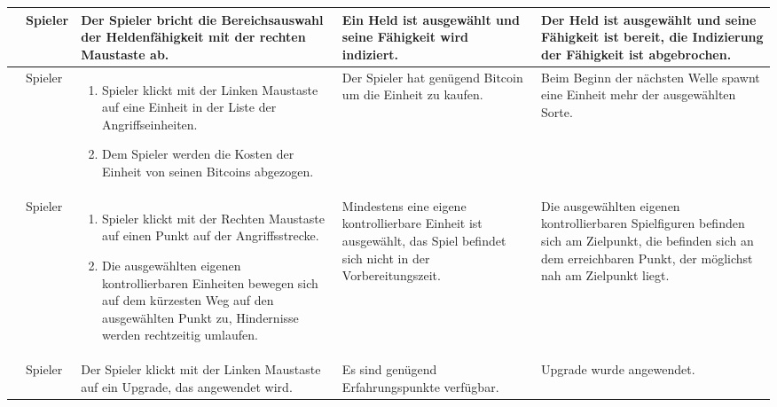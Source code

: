 \begin{longtabu}{X[0.6L]X[0.4L]X[L]X[L]X[L]}
	& Spieler
	& Der Spieler bricht die Bereichsauswahl der Heldenfähigkeit mit der rechten Maustaste ab.
	& Ein Held ist ausgewählt und seine Fähigkeit wird indiziert.
	& Der Held ist ausgewählt und seine Fähigkeit ist bereit, die Indizierung der Fähigkeit ist abgebrochen.
	\\\midrule

    & Spieler
    & \vspace*{-0.2cm}\begin{enumerate}[nosep,leftmargin=*]
        \item Spieler klickt mit der Linken Maustaste auf eine Einheit in der
          Liste der Angriffseinheiten.
        \item Dem Spieler werden die Kosten der Einheit von seinen Bitcoins
          abgezogen.
      \end{enumerate}
    & Der Spieler hat genügend Bitcoin um die Einheit zu kaufen.
    & Beim Beginn der nächsten Welle spawnt eine Einheit mehr der ausgewählten
      Sorte.
  \\\midrule

    & Spieler
    & \vspace*{-0.2cm}\begin{enumerate}[nosep,leftmargin=*]
        \item Spieler klickt mit der Rechten Maustaste auf einen Punkt auf der
          Angriffsstrecke.
        \item Die ausgewählten eigenen kontrollierbaren Einheiten bewegen sich
          auf dem kürzesten Weg auf den ausgewählten Punkt zu, Hindernisse
          werden rechtzeitig umlaufen.
      \end{enumerate}
    & Mindestens eine eigene kontrollierbare Einheit ist ausgewählt, das Spiel
      befindet sich nicht in der Vorbereitungszeit.
    & Die ausgewählten eigenen kontrollierbaren Spielfiguren befinden sich am
      Zielpunkt, \textbf{} die befinden sich an dem erreichbaren
      Punkt, der möglichst nah am Zielpunkt liegt.
  \\\midrule

    & Spieler
    & Der Spieler klickt mit der Linken Maustaste auf ein Upgrade, das
      angewendet wird.
    & Es sind genügend Erfahrungspunkte verfügbar.
    & Upgrade wurde angewendet.
  \\\midrule


\end{longtabu}
